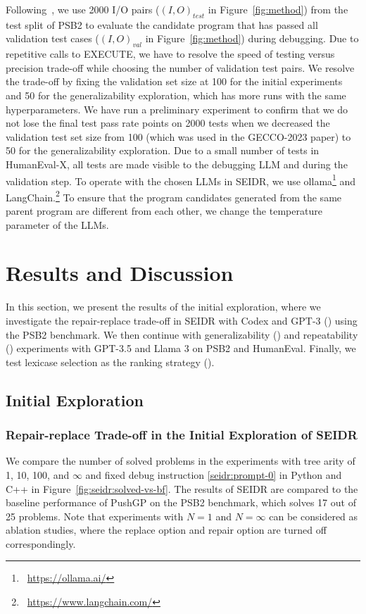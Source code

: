 Following~\cite{psb2}, we use 2000 I/O pairs ($\left(I, O\right)_{test}$ in Figure~\ref{fig:method}) from the test split of PSB2 to evaluate the candidate program that has passed all validation test cases ($\left(I, O\right)_{val}$ in Figure~\ref{fig:method}) during debugging. 
Due to repetitive calls to EXECUTE, we have to resolve the speed of testing versus precision trade-off while choosing the number of validation test pairs.
We resolve the trade-off by fixing the validation set size at 100 for the initial experiments and 50 for the generalizability exploration, which has more runs with the same hyperparameters. 
We have run a preliminary experiment to confirm that we do not lose the final test pass rate points on 2000 tests when we decreased the validation test set size from 100 (which was used in the GECCO-2023 paper) to 50 for the generalizability exploration.
Due to a small number of tests in HumanEval-X, all tests are made visible to the debugging LLM and during the validation step.  
To operate with the chosen LLMs in SEIDR, we use ollama\footnote{~\url{https://ollama.ai/}} and LangChain.\footnote{~\url{https://www.langchain.com/}}  
To ensure that the program candidates generated from the same parent program are different from each other, we change the temperature parameter of the LLMs. 
 

\section{Results and Discussion}
\label{sec:seidr-results}

In this section, we present the results of the initial exploration, where we investigate the repair-replace trade-off in SEIDR with Codex and GPT-3 (\rqtreearity{}) using the PSB2 benchmark.
We then continue with generalizability (\rqllama{}) and repeatability (\rqmultirun{}) experiments with GPT-3.5 and Llama 3 on PSB2 and HumanEval.
Finally, we test lexicase selection as the ranking strategy (\rqlexicase{}).

\subsection{Initial Exploration}

\subsubsection{Repair-replace Trade-off in the Initial Exploration of SEIDR}
\label{sec:seidr-seidr:rqtreearity}
We compare the number of solved problems in the experiments with tree arity of 1, 10, 100, and $\infty$ and fixed debug instruction \ref{seidr:prompt-0} in Python and C++ in Figure~\ref{fig:seidr:solved-vs-bf}. 
The results of SEIDR are compared to the baseline performance of PushGP on the PSB2 benchmark, which solves 17 out of 25 problems. 
Note that experiments with $N=1$ and $N=\infty$ can be considered as ablation studies, where the replace option and repair option are turned off correspondingly. 

